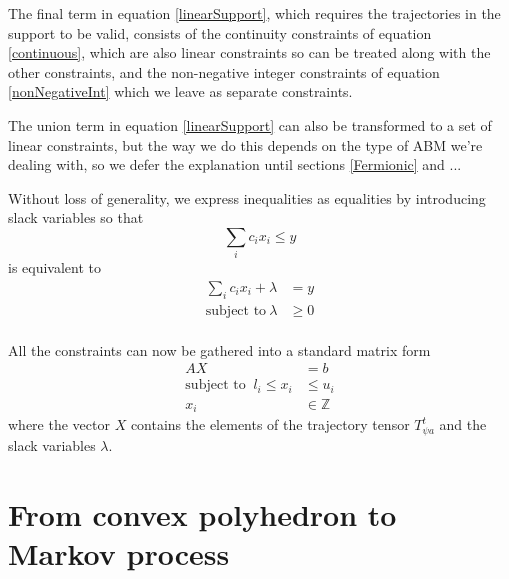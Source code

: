 \documentclass{article}
\begin{document}
The final term in equation \ref{linearSupport}, which requires the trajectories in the support to be valid, consists of the continuity constraints of equation \ref{continuous}, which are also linear constraints so can be treated along with the other constraints, and the non-negative integer constraints of equation \ref{nonNegativeInt} which we leave as separate constraints.

The union term in equation \ref{linearSupport} can also be transformed to a set of linear constraints, but the way we do this depends on the type of ABM we're dealing with, so we defer the explanation until sections \ref{Fermionic} and ...

Without loss of generality, we express inequalities as equalities by introducing slack variables so that
\[
\sum_i c_i x_i \le y
\]
is equivalent to
\[
\begin{split}
\sum_i c_i x_i + \lambda & = y \\
\text{subject to}\ \lambda & \ge 0 \\
\end{split}
\]

All the constraints can now be gathered into a standard matrix form
\begin{equation}
\begin{split}
AX &= b \\
\text{subject to }\ l_i \le x_i &\le u_i\\
x_i &\in \mathbb{Z}
\end{split}
\label{Axy}
\end{equation}
where the vector $X$ contains the elements of the trajectory tensor $T^t_{\psi a}$ and the slack variables $\lambda$.

\section{From convex polyhedron to Markov process}
\end{document}

